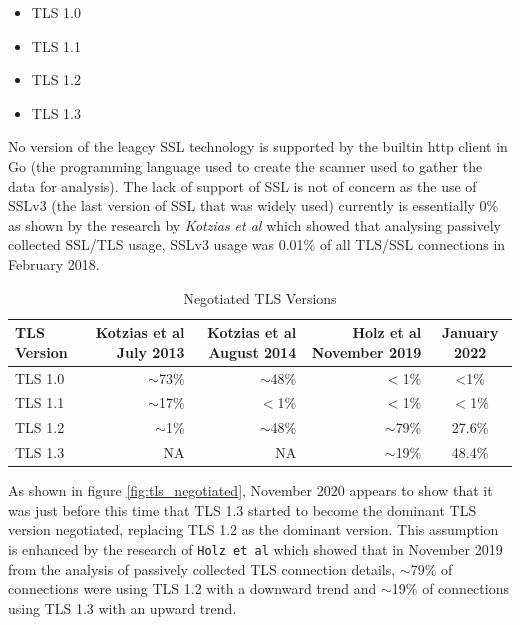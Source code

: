 \documentclass{mscreport}
\begin{document}
\begin{itemize}
  \setlength\itemsep{0.1em}
  \item TLS 1.0
  \item TLS 1.1
  \item TLS 1.2
  \item TLS 1.3
\end{itemize}

\noindent
No version of the leagcy SSL technology is supported by the builtin http client in Go (the programming language used to create the scanner used to gather the data for analysis). The lack of support of SSL is not of concern as the use of SSLv3 (the last version of SSL that was widely used) currently is essentially 0\% as shown by the research by \textit{Kotzias et al} \cite{Kotzias2018-wd} which showed that analysing passively collected SSL/TLS usage, SSLv3 usage was 0.01\% of all TLS/SSL connections in February 2018.

\begin{table}[H]
\footnotesize
  \begin{center}
    \begin{tabular}{|l|D|D|D|c|}  %
      \hline
      \textbf{TLS Version} & \textbf{Kotzias et al} \cite{Kotzias2018-wd} July 2013 & \textbf{Kotzias et al} \cite{Kotzias2018-wd} August 2014 & \textbf{Holz et al} \cite{Holz2020-ha} November 2019 & January 2022 \\
      \hline
	  TLS 1.0 & $\sim$73\% & $\sim$48\% & $<$1\% & <1\%\\
	  \hline
	  TLS 1.1 & $\sim$17\% & $<$1\% & $<$1\% & $<$1\%\\
	  \hline
	  TLS 1.2 & $\sim$1\% & $\sim$48\% & $\sim$79\% & 27.6\%\\
	  \hline
	  TLS 1.3 & NA & NA & $\sim$19\% & 48.4\%\\
	  \hline
    \end{tabular}
    \caption{Negotiated TLS Versions}
    \label{table:tls_negotiated} %
  \end{center}
\end{table}

\noindent
As shown in figure \ref{fig:tls_negotiated}, November 2020 appears to show that it was just before this time that TLS 1.3 started to become the dominant TLS version negotiated, replacing TLS 1.2 as the dominant version. This assumption is enhanced by the research of \texttt{Holz et al} \cite{Holz2020-ha} which showed that in November 2019 from the analysis of passively collected TLS connection details, $\sim$79\% of connections were using TLS 1.2 with a downward trend and $\sim$19\% of connections using TLS 1.3 with an upward trend.
\end{document}
